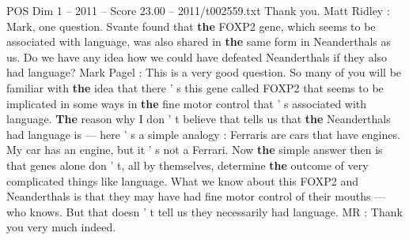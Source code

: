 \begin{textsample}{POS Dim 1 – 2011 – Score 23.00 – 2011/t002559.txt}
Thank you.
Matt Ridley : Mark, one question.
Svante found that \textbf{the} FOXP2 gene, which seems to be associated with language, was also shared in \textbf{the} same form in Neanderthals as us.
Do we have any idea how we could have defeated Neanderthals if they also had language?
Mark Pagel : This is a very good question.
So many of you will be familiar with \textbf{the} idea that there ' s this gene called FOXP2 that seems to be implicated in some ways in \textbf{the} fine motor control that ' s associated with language. \textbf{The} reason why I don ' t believe that tells us that \textbf{the} Neanderthals had language is — here ' s a simple analogy : Ferraris are cars that have engines.
My car has an engine, but it ' s not a Ferrari.
Now \textbf{the} simple answer then is that genes alone don ' t, all by themselves, determine \textbf{the} outcome of very complicated things like language.
What we know about this FOXP2 and Neanderthals is that they may have had fine motor control of their mouths — who knows.
But that doesn ' t tell us they necessarily had language.
MR : Thank you very much indeed.

\end{textsample}
